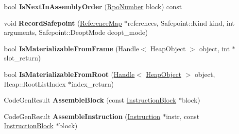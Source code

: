 \begin{DoxyCompactItemize}
\item 
bool {\bfseries Is\+Next\+In\+Assembly\+Order} (\hyperlink{classv8_1_1internal_1_1compiler_1_1_rpo_number}{Rpo\+Number} block) const \hypertarget{classv8_1_1internal_1_1compiler_1_1_code_generator_a7cbd6c667d0afa136b01a36afa9eec93}{}\label{classv8_1_1internal_1_1compiler_1_1_code_generator_a7cbd6c667d0afa136b01a36afa9eec93}

\item 
void {\bfseries Record\+Safepoint} (\hyperlink{classv8_1_1internal_1_1compiler_1_1_reference_map}{Reference\+Map} $\ast$references, Safepoint\+::\+Kind kind, int arguments, Safepoint\+::\+Deopt\+Mode deopt\+\_\+mode)\hypertarget{classv8_1_1internal_1_1compiler_1_1_code_generator_a2a26b8eb4c0add510993b6ee5004e0d8}{}\label{classv8_1_1internal_1_1compiler_1_1_code_generator_a2a26b8eb4c0add510993b6ee5004e0d8}

\item 
bool {\bfseries Is\+Materializable\+From\+Frame} (\hyperlink{classv8_1_1internal_1_1_handle}{Handle}$<$ \hyperlink{classv8_1_1internal_1_1_heap_object}{Heap\+Object} $>$ object, int $\ast$slot\+\_\+return)\hypertarget{classv8_1_1internal_1_1compiler_1_1_code_generator_a6a1783a34a4c1895eaed7176c95b0f4d}{}\label{classv8_1_1internal_1_1compiler_1_1_code_generator_a6a1783a34a4c1895eaed7176c95b0f4d}

\item 
bool {\bfseries Is\+Materializable\+From\+Root} (\hyperlink{classv8_1_1internal_1_1_handle}{Handle}$<$ \hyperlink{classv8_1_1internal_1_1_heap_object}{Heap\+Object} $>$ object, Heap\+::\+Root\+List\+Index $\ast$index\+\_\+return)\hypertarget{classv8_1_1internal_1_1compiler_1_1_code_generator_a2e1bdf9a06a8cbc5b49a80e592141776}{}\label{classv8_1_1internal_1_1compiler_1_1_code_generator_a2e1bdf9a06a8cbc5b49a80e592141776}

\item 
Code\+Gen\+Result {\bfseries Assemble\+Block} (const \hyperlink{classv8_1_1internal_1_1compiler_1_1_instruction_block}{Instruction\+Block} $\ast$block)\hypertarget{classv8_1_1internal_1_1compiler_1_1_code_generator_a766323e4c1a809c4c2259c2f9c036aea}{}\label{classv8_1_1internal_1_1compiler_1_1_code_generator_a766323e4c1a809c4c2259c2f9c036aea}

\item 
Code\+Gen\+Result {\bfseries Assemble\+Instruction} (\hyperlink{classv8_1_1internal_1_1compiler_1_1_instruction}{Instruction} $\ast$instr, const \hyperlink{classv8_1_1internal_1_1compiler_1_1_instruction_block}{Instruction\+Block} $\ast$block)\hypertarget{classv8_1_1internal_1_1compiler_1_1_code_generator_ab600681745b4518736db3de813bb47fd}{}\label{classv8_1_1internal_1_1compiler_1_1_code_generator_ab600681745b4518736db3de813bb47fd}


\end{DoxyCompactItemize}
